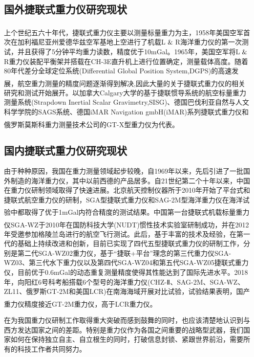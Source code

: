 \documentclass[12pt,a4,utf8]{article}
\newcommand{\upcite}[1]{\textsuperscript{\textsuperscript{\cite{#1}}}} %
\begin{document}
\subsection{国外捷联式重力仪研究现状}
上个世纪五六十年代，捷联式重力仪主要以测量标量重力为主\upcite{peshekhonovstate,thompson1959aerial,thompson1960aerial}，1958年美国空军首次在加利福尼亚州爱德华兹空军基地上空进行了机载L$\And$R海洋重力仪的第一次测试，并且获得了5分钟平均重力读数，精度优于10mGal。1965年，美国空军将L$\And$R重力仪装配平衡架并搭载在CH-3E直升机上进行位置确定，测量载体高度。随着80年代差分全球定位系统(Differential Global Position System,DGPS)的高速发展，航空重力测量的精度问题逐渐得到解决\upcite{thompson1960aerial,brozena1989interferometric,schwarz1989comparison,kleusberg1990airborne},因此大量的关于捷联式重力仪的相关研究和测试开始展开。以加拿大Calgary大学的基于捷联惯导系统的航空标量重力测量系统(Strapdown Inertial Scalar Gravimetry,SISG)、德国巴伐利亚自然与人文科学学院的SAGS系统、德国iMAR Navigation gmbH(iMAR)系列捷联式重力仪和俄罗斯莫斯科重力测量技术公司的GT-X型重力仪为代表\upcite{bruton2000improving,meyer2003angel,bastos2002gravity,boedecker2006sags4,berzhitskii2010airborne,hoss20201}。
\subsection{国内捷联式重力仪研究现状}
由于种种原因，我国在重力测量领域起步较晚，自1969年以来，先后引进了一批国外制造的海洋重力仪，其中以前西德的产品居多。自21世纪第二个十年以来，中国在重力仪研制领域取得了快速进展。北京航天控制仪器所于2010年开始了平台式和捷联式航空重力仪的研制，SGA型捷联式重力仪和SAG-2M型海洋重力仪在海洋试验中都取得了优于1mGal内符合精度的测试结果\upcite{xiurui}。中国第一台捷联式机载标量重力仪SGA-WZ于2010年在国防科技大学(NUDT)惯性技术实验室研制成功\upcite{DHKZ2020Z1020}，并在2012年受邀参加格陵兰岛进行的航空飞行测试。此后，基于丰富的技术及经验，在第一代的基础上持续改进和创新，目前已实现了四代五型捷联式重力仪的研制工作，分别是第二代SGA-WZ02重力仪，基于“捷联+平台”理念的第三代重力仪SGA-WZ03、第三代水下重力仪以及第四代SGA-WZ04和第五代SGA-WZ05捷联式重力仪，目前优于0.6mGal的动态重复测量精度使得其性能达到了国际先进水平。2018年，向阳红6号科考船搭载6个型号的海洋重力仪(CHZ-Ⅱ、SAG-2M、SGA-WZ、ZL11、俄罗斯GT-2M和美国LCR)在南海海域开展对比试验，试验结果表明，国产重力仪精度接近GT-2M重力仪，高于LCR重力仪\upcite{yuan2020performance}。

在为我国重力仪研制工作取得重大突破而感到鼓舞的同时，也应该清楚地认识到与西方发达国家之间的差距。特别是重力仪作为各国之间重要的战略型武器，我们国家如何在保持独立自主、自立根生的同时，打破信息封锁、紧跟世界前沿，需要所有的科技工作者共同努力。
\end{document}
